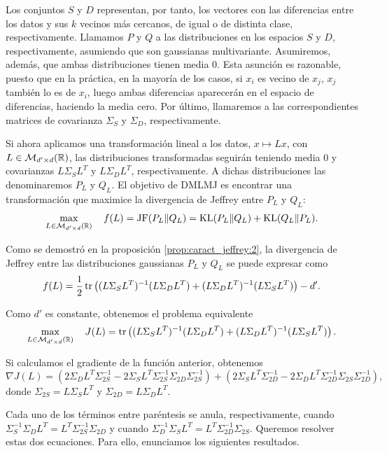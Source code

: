 Los conjuntos $S$ y $D$ representan, por tanto, los vectores con las diferencias entre los datos y sus $k$ vecinos más cercanos, de igual o de distinta clase, respectivamente. Llamamos $P$ y $Q$ a las distribuciones en los espacios $S$ y $D$, respectivamente, asumiendo que son gaussianas multivariante. Asumiremos, además, que ambas distribuciones tienen media 0. Esta asunción es razonable, puesto que en la práctica, en la mayoría de los casos, si $x_i$ es vecino de $x_j$, $x_j$ también lo es de $x_i$, luego ambas diferencias aparecerán en el espacio de diferencias, haciendo la media cero. Por último, llamaremos a las correspondientes matrices de covarianza $\Sigma_S$ y $\Sigma_D$, respectivamente.

Si ahora aplicamos una transformación lineal a los datos, $x \mapsto Lx$, con $L \in \mathcal{M}_{d'\times d}(\mathbb{R})$, las distribuciones transformadas seguirán teniendo media 0 y covarianzas $L\Sigma_S L^T$ y $L\Sigma_D L^T$, respectivamente. A dichas distribuciones las denominaremos $P_L$ y $Q_L$. El objetivo de DMLMJ es encontrar una transformación que maximice la divergencia de Jeffrey entre $P_L$ y $Q_L$:
\[ \max_{L \in \mathcal{M}_{d'\times d}(\mathbb{R})} \quad f(L) =  \operatorname{JF}(P_L\|Q_L) = \operatorname{KL}(P_L\|Q_L) + \operatorname{KL}(Q_L\|P_L).\]

Como se demostró en la proposición \ref{prop:caract_jeffrey:2}, la divergencia de Jeffrey entre las distribuciones gaussianas $P_L$ y $Q_L$ se puede expresar como 
\[ f(L) = \frac{1}{2} \operatorname{tr}\left( (L\Sigma_S L^T)^{-1} (L\Sigma_D L^T) + (L \Sigma_D L^T)^{-1} (L \Sigma_S L^T) \right) - d'. \]

Como $d'$ es constante, obtenemos el problema equivalente
\[ \max_{L \in \mathcal{M}_{d'\times d}(\mathbb{R})} \quad J(L) =  \operatorname{tr}\left( (L\Sigma_S L^T)^{-1} (L\Sigma_D L^T) + (L \Sigma_D L^T)^{-1} (L \Sigma_S L^T) \right).\]

Si calculamos el gradiente de la función anterior, obtenemos
\[ \nabla J(L) = \left( 2 \Sigma_D L^T\Sigma_{2S}^{-1} - 2\Sigma_S L^T \Sigma_{2S}^{-1}\Sigma_{2D}\Sigma_{2S}^{-1} \right) + \left( 2\Sigma_S L^T \Sigma_{2D}^{-1} - 2 \Sigma_D L^T \Sigma_{2D}^{-1}\Sigma_{2S} \Sigma_{2D}^{-1} \right),\]
donde $\Sigma_{2S} = L \Sigma_S L^T$ y $\Sigma_{2D} = L\Sigma_D L^T$.

Cada uno de los términos entre paréntesis se anula, respectivamente, cuando $\Sigma_S^{-1} \Sigma_D L^T = L^T \Sigma_{2S}^{-1} \Sigma_{2D}$ y cuando $\Sigma_{D}^{-1}\Sigma_S L^T = L^T \Sigma_{2D}^{-1} \Sigma_{2S}$. Queremos resolver estas dos ecuaciones. Para ello, enunciamos los siguientes resultados.

